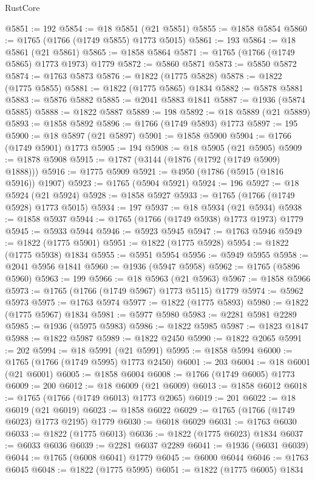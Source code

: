 \begin{lexlean}{RustCore}
\begin{coremodule}
@5851 := 192
@5854 := @18 @5851 (@21 @5851)
@5855 := @1858 @5854
@5860 := @1765 (@1766 (@1749 @5855) @1773 @5015)
@5861 := 193
@5864 := @18 @5861 (@21 @5861)
@5865 := @1858 @5864
@5871 := @1765 (@1766 (@1749 @5865) @1773 @1973) @1779
@5872 := @5860 @5871
@5873 := @5850 @5872
@5874 := @1763 @5873
@5876 := @1822 (@1775 @5828)
@5878 := @1822 (@1775 @5855)
@5881 := @1822 (@1775 @5865) @1834
@5882 := @5878 @5881
@5883 := @5876 @5882
@5885 := @2041 @5883 @1841
@5887 := @1936 (@5874 @5885)
@5888 := @1822 @5887
@5889 := 198
@5892 := @18 @5889 (@21 @5889)
@5893 := @1858 @5892
@5896 := @1766 (@1749 @5893) @1773
@5897 := 195
@5900 := @18 @5897 (@21 @5897)
@5901 := @1858 @5900
@5904 := @1766 (@1749 @5901) @1773
@5905 := 194
@5908 := @18 @5905 (@21 @5905)
@5909 := @1878 @5908
@5915 := @1787 (@3144 (@1876 (@1792 (@1749 @5909) @1888)))
@5916 := @1775 @5909
@5921 := @4950 (@1786 (@5915 (@1816 @5916)) @1907)
@5923 := @1765 (@5904 @5921)
@5924 := 196
@5927 := @18 @5924 (@21 @5924)
@5928 := @1858 @5927
@5933 := @1765 (@1766 (@1749 @5928) @1773 @5015)
@5934 := 197
@5937 := @18 @5934 (@21 @5934)
@5938 := @1858 @5937
@5944 := @1765 (@1766 (@1749 @5938) @1773 @1973) @1779
@5945 := @5933 @5944
@5946 := @5923 @5945
@5947 := @1763 @5946
@5949 := @1822 (@1775 @5901)
@5951 := @1822 (@1775 @5928)
@5954 := @1822 (@1775 @5938) @1834
@5955 := @5951 @5954
@5956 := @5949 @5955
@5958 := @2041 @5956 @1841
@5960 := @1936 (@5947 @5958)
@5962 := @1765 (@5896 @5960)
@5963 := 199
@5966 := @18 @5963 (@21 @5963)
@5967 := @1858 @5966
@5973 := @1765 (@1766 (@1749 @5967) @1773 @5115) @1779
@5974 := @5962 @5973
@5975 := @1763 @5974
@5977 := @1822 (@1775 @5893)
@5980 := @1822 (@1775 @5967) @1834
@5981 := @5977 @5980
@5983 := @2281 @5981 @2289
@5985 := @1936 (@5975 @5983)
@5986 := @1822 @5985
@5987 := @1823 @1847
@5988 := @1822 @5987
@5989 := @1822 @2450
@5990 := @1822 @2065
@5991 := 202
@5994 := @18 @5991 (@21 @5991)
@5995 := @1858 @5994
@6000 := @1765 (@1766 (@1749 @5995) @1773 @2450)
@6001 := 203
@6004 := @18 @6001 (@21 @6001)
@6005 := @1858 @6004
@6008 := @1766 (@1749 @6005) @1773
@6009 := 200
@6012 := @18 @6009 (@21 @6009)
@6013 := @1858 @6012
@6018 := @1765 (@1766 (@1749 @6013) @1773 @2065)
@6019 := 201
@6022 := @18 @6019 (@21 @6019)
@6023 := @1858 @6022
@6029 := @1765 (@1766 (@1749 @6023) @1773 @2195) @1779
@6030 := @6018 @6029
@6031 := @1763 @6030
@6033 := @1822 (@1775 @6013)
@6036 := @1822 (@1775 @6023) @1834
@6037 := @6033 @6036
@6039 := @2281 @6037 @2289
@6041 := @1936 (@6031 @6039)
@6044 := @1765 (@6008 @6041) @1779
@6045 := @6000 @6044
@6046 := @1763 @6045
@6048 := @1822 (@1775 @5995)
@6051 := @1822 (@1775 @6005) @1834

\end{coremodule}
\end{lexlean}
